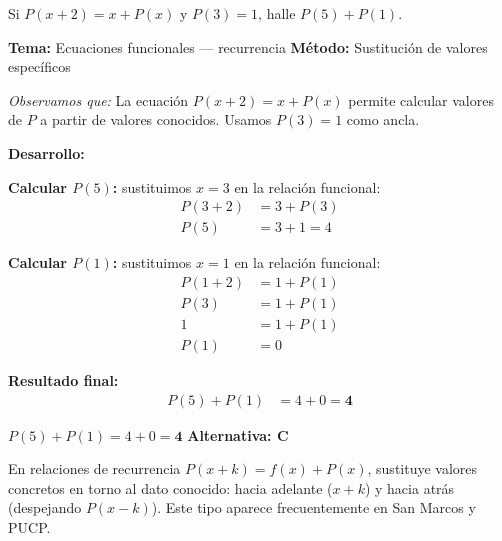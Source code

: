 \begin{tcolorbox}[
  enhanced, breakable,
  colback=GrisClaro, colframe=AzulPizarra,
  fonttitle=\bfseries\sffamily\color{white},
  title={Álgebra — Ejercicio 5},
  arc=3pt, boxrule=0.8pt
]

\begin{problema}
  Si $P(x+2) = x + P(x)$ y $P(3) = 1$, halle $P(5) + P(1)$.
\end{problema}

\smallskip
\noindent
\textbf{\sffamily\color{AzulMedio}Tema:} Ecuaciones funcionales — recurrencia \hfill
\textbf{\sffamily\color{AzulMedio}Método:} Sustitución de valores específicos

\medskip
\noindent\textit{Observamos que:} La ecuación $P(x+2) = x + P(x)$ permite calcular
valores de $P$ a partir de valores conocidos. Usamos $P(3) = 1$ como ancla.

\noindent\textbf{\sffamily Desarrollo:}

\textbf{Calcular $P(5)$:} sustituimos $x = 3$ en la relación funcional:
\begin{align*}
  P(3 + 2) &= 3 + P(3) \\
  P(5)     &= 3 + 1 = 4
\end{align*}

\textbf{Calcular $P(1)$:} sustituimos $x = 1$ en la relación funcional:
\begin{align*}
  P(1 + 2) &= 1 + P(1) \\
  P(3)     &= 1 + P(1) \\
  1        &= 1 + P(1) \\
  P(1)     &= 0
\end{align*}

\textbf{Resultado final:}
\begin{align*}
  P(5) + P(1) &= 4 + 0 = \mathbf{4}
\end{align*}

\begin{tcolorbox}[
  colback=AzulClaro!60, colframe=AzulPizarra,
  arc=2pt, boxrule=0.8pt, left=8pt, right=8pt
]
\centering
$\displaystyle P(5) + P(1) = 4 + 0 = \mathbf{4}$
\quad\textbf{Alternativa: C}
\end{tcolorbox}

\begin{cajatip}
En relaciones de recurrencia $P(x+k) = f(x) + P(x)$, sustituye valores concretos
en torno al dato conocido: hacia adelante ($x+k$) y hacia atrás (despejando $P(x-k)$).
Este tipo aparece frecuentemente en San Marcos y PUCP.
\end{cajatip}

\end{tcolorbox}

